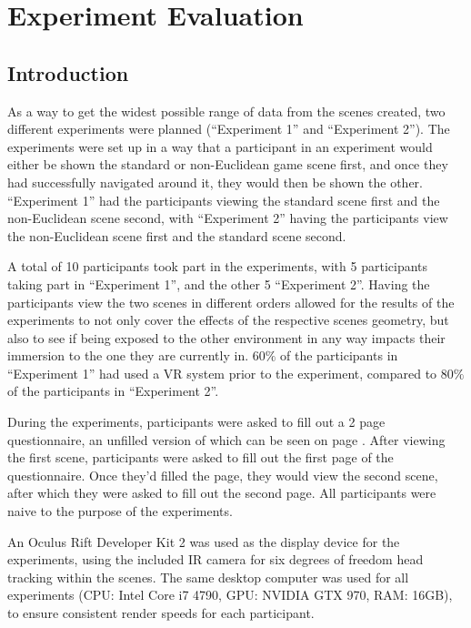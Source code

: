\chapter[Experiment]{Experiment Evaluation}
\label{exp}

	\section{Introduction}
	\label{exp:intro}

		As a way to get the widest possible range of data from the scenes created, two different experiments were planned (\enquote{Experiment 1} and \enquote{Experiment 2}).
		The experiments were set up in a way that a participant in an experiment would either be shown the standard or non-Euclidean game scene first, and once they had successfully navigated around it, they would then be shown the other.
		\enquote{Experiment 1} had the participants viewing the standard scene first and the non-Euclidean scene second, with \enquote{Experiment 2} having the participants view the non-Euclidean scene first and the standard scene second.

		A total of 10 participants took part in the experiments, with 5 participants taking part in \enquote{Experiment 1}, and the other 5 \enquote{Experiment 2}.
		Having the participants view the two scenes in different orders allowed for the results of the experiments to not only cover the effects of the respective scenes geometry, but also to see if being exposed to the other environment in any way impacts their immersion to the one they are currently in. %
		$60\%$ of the participants in \enquote{Experiment 1} had used a VR system prior to the experiment, compared to $80\%$ of the participants in \enquote{Experiment 2}.

		During the experiments, participants were asked to fill out a 2 page questionnaire, an unfilled version of which can be seen on page \pageref{appendix:question}.
		After viewing the first scene, participants were asked to fill out the first page of the questionnaire. Once they'd filled the page, they would view the second scene, after which they were asked to fill out the second page. %
		All participants were naive to the purpose of the experiments.

		An Oculus Rift Developer Kit 2 was used as the display device for the experiments, using the included IR camera for six degrees of freedom head tracking within the scenes.
		The same desktop computer was used for all experiments (CPU: Intel Core i7 4790, GPU: NVIDIA GTX 970, RAM: 16GB), to ensure consistent render speeds for each participant.

